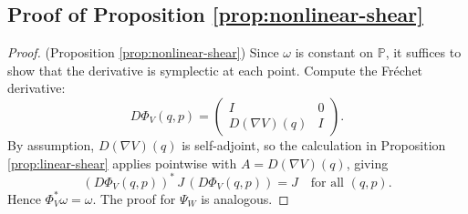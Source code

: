 \documentclass{article}
\theoremstyle{plain}
\theoremstyle{definition}
\theoremstyle{remark}
\newcommand{\bbP}{\mathbb{P}}
\begin{document}
\subsection{Proof of Proposition \ref{prop:nonlinear-shear}}
\begin{proof}(Proposition \ref{prop:nonlinear-shear})
Since $\omega$ is constant on $\bbP$, it suffices to show that the derivative is symplectic at each point.
Compute the Fr\'echet derivative:
\[
D\Phi_V(q,p)=
\begin{pmatrix}
I & 0\\
D(\nabla V)(q) & I
\end{pmatrix}.
\]
By assumption, $D(\nabla V)(q)$ is self-adjoint, so the calculation in Proposition
\ref{prop:linear-shear} applies pointwise with $A=D(\nabla V)(q)$, giving
\[
(D\Phi_V(q,p))^*\,J\,(D\Phi_V(q,p))=J
\quad\text{for all }(q,p).
\]
Hence $\Phi_V^*\omega=\omega$. The proof for $\Psi_W$ is analogous.
\end{proof}
\end{document}
